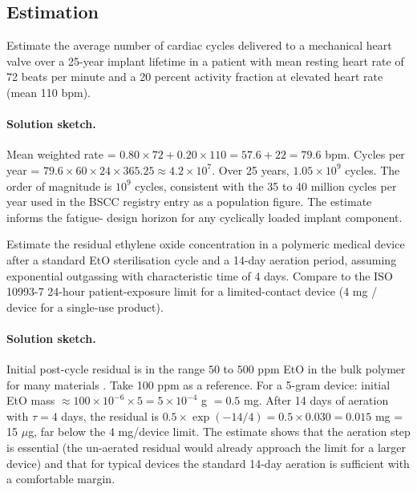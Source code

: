\subsection*{Estimation}

\begin{exercise}
Estimate the average number of cardiac cycles delivered to a
mechanical heart valve over a 25-year implant lifetime in a patient
with mean resting heart rate of 72 beats per minute and a 20
percent activity fraction at elevated heart rate (mean 110 bpm).
\end{exercise}

\paragraph{Solution sketch.}
Mean weighted rate = $0.80 \times 72 + 0.20 \times 110 = 57.6 +
22 = 79.6$ bpm. Cycles per year = $79.6 \times 60 \times 24 \times
365.25 \approx 4.2 \times 10^7$. Over 25 years, $1.05 \times 10^9$
cycles. The order of magnitude is $10^9$ cycles, consistent with
the 35 to 40 million cycles per year used in the BSCC registry
entry as a population figure. The estimate informs the fatigue-
design horizon for any cyclically loaded implant component.

\begin{exercise}
Estimate the residual ethylene oxide concentration in a polymeric
medical device after a standard EtO sterilisation cycle and a 14-day
aeration period, assuming exponential outgassing with characteristic
time of 4 days. Compare to the ISO 10993-7 24-hour patient-exposure
limit for a limited-contact device (4 mg / device for a single-use
product).
\end{exercise}

\paragraph{Solution sketch.}
Initial post-cycle residual is in the range $50$ to $500$ ppm
EtO in the bulk polymer for many materials
\cite{paper:v6c12-zhang-eo-residuals-2019}. Take 100 ppm as a
reference. For a 5-gram device: initial EtO mass $\approx 100 \times
10^{-6} \times 5 = 5 \times 10^{-4}$ g $= 0.5$ mg. After 14 days of
aeration with $\tau = 4$ days, the residual is $0.5 \times
\exp(-14/4) = 0.5 \times 0.030 = 0.015$ mg = 15 $\mu$g, far below
the 4 mg/device limit. The estimate shows that the aeration step
is essential (the un-aerated residual would already approach the
limit for a larger device) and that for typical devices the
standard 14-day aeration is sufficient with a comfortable margin.

